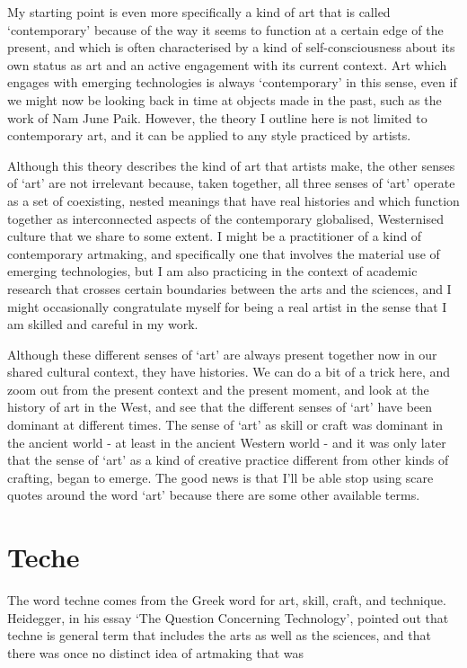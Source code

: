 \documentclass[letterpaper]{article}
\begin{document}
My starting point is even more specifically a kind of art that is called ‘contemporary’ because of the way it seems to function at a certain edge of the present, and which is often characterised by a kind of self-consciousness about its own status as art and an active engagement with its current context. Art which engages with emerging technologies is always ‘contemporary’ in this sense, even if we might now be looking back in time at objects made in the past, such as the work of Nam June Paik. However, the theory I outline here is not limited to contemporary art, and it can be applied to any style practiced by artists.

Although this theory describes the kind of art that artists make, the other senses of ‘art’ are not irrelevant because, taken together, all three senses of ‘art’ operate as a set of coexisting, nested meanings that have real histories and which function together as interconnected aspects of the contemporary globalised, Westernised culture that we share to some extent. I might be a practitioner of a kind of contemporary artmaking, and specifically one that involves the material use of emerging technologies, but I am also practicing in the context of academic research that crosses certain boundaries between the arts and the sciences, and I might occasionally congratulate myself for being a real artist in the sense that I am skilled and careful in my work.

Although these different senses of ‘art’ are always present together now in our shared cultural context, they have histories. We can do a bit of a trick here, and zoom out from the present context and the present moment, and look at the history of art in the West, and see that the different senses of ‘art’ have been dominant at different times. The sense of ‘art’ as skill or craft was dominant in the ancient world - at least in the ancient Western world - and it was only later that the sense of ‘art’ as a kind of creative practice different from other kinds of crafting, began to emerge. The good news is that I'll be able stop using scare quotes around the word ‘art’ because there are some other available terms.

\section{Teche}

The word techne comes from the Greek word for art, skill, craft, and technique. Heidegger, in his essay ‘The Question Concerning Technology’, pointed out that techne is general term that includes the arts as well as the sciences, and that there was once no distinct idea of artmaking that was
\end{document}

